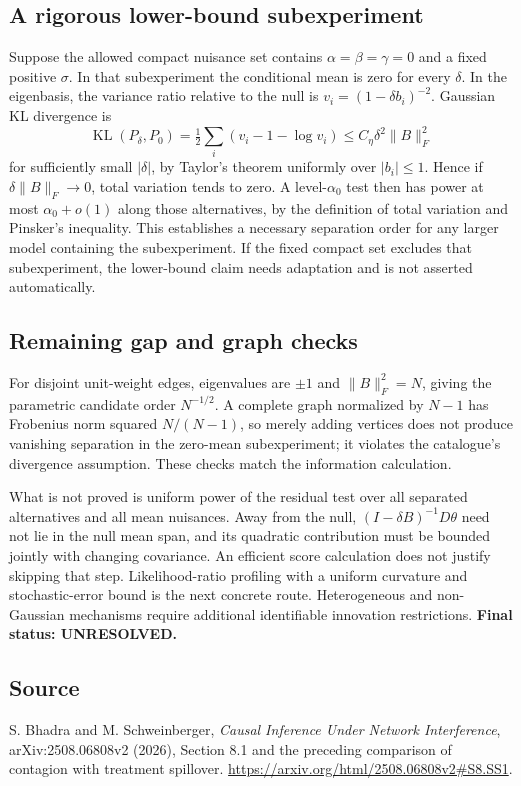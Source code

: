 \documentclass[11pt]{article}
\begin{document}
\subsection*{A rigorous lower-bound subexperiment}
Suppose the allowed compact nuisance set contains $\alpha=\beta=\gamma=0$
and a fixed positive $\sigma$. In that subexperiment the conditional mean
is zero for every $\delta$. In the eigenbasis, the variance ratio relative
to the null is $v_i=(1-\delta b_i)^{-2}$. Gaussian KL divergence is
\[
 \operatorname{KL}(P_\delta,P_0)
 =\tfrac12\sum_i(v_i-1-\log v_i)
 \leq C_\eta\delta^2\|B\|_F^2
\]
for sufficiently small $|\delta|$, by Taylor's theorem uniformly over
$|b_i|\leq1$. Hence if $\delta\|B\|_F\to0$, total variation tends to
zero. A level-$\alpha_0$ test then has power at most $\alpha_0+o(1)$
along those alternatives, by the definition of total variation and
Pinsker's inequality. This establishes a necessary separation order for
any larger model containing the subexperiment. If the fixed compact set
excludes that subexperiment, the lower-bound claim needs adaptation and is
not asserted automatically.

\subsection*{Remaining gap and graph checks}
For disjoint unit-weight edges, eigenvalues are $\pm1$ and
$\|B\|_F^2=N$, giving the parametric candidate order $N^{-1/2}$.
A complete graph normalized by $N-1$ has Frobenius norm squared
$N/(N-1)$, so merely adding vertices does not produce vanishing separation
in the zero-mean subexperiment; it violates the catalogue's divergence
assumption. These checks match the information calculation.

What is not proved is uniform power of the residual test over all separated
alternatives and all mean nuisances. Away from the null,
$(I-\delta B)^{-1}D\theta$ need not lie in the null mean span, and its
quadratic contribution must be bounded jointly with changing covariance.
An efficient score calculation does not justify skipping that step.
Likelihood-ratio profiling with a uniform curvature and stochastic-error
bound is the next concrete route. Heterogeneous and non-Gaussian mechanisms
require additional identifiable innovation restrictions.
\textbf{Final status: UNRESOLVED.}

\subsection*{Source}
S. Bhadra and M. Schweinberger, \emph{Causal Inference Under Network
Interference}, arXiv:2508.06808v2 (2026), Section 8.1 and the preceding
comparison of contagion with treatment spillover.
\url{https://arxiv.org/html/2508.06808v2#S8.SS1}.
\end{document}
